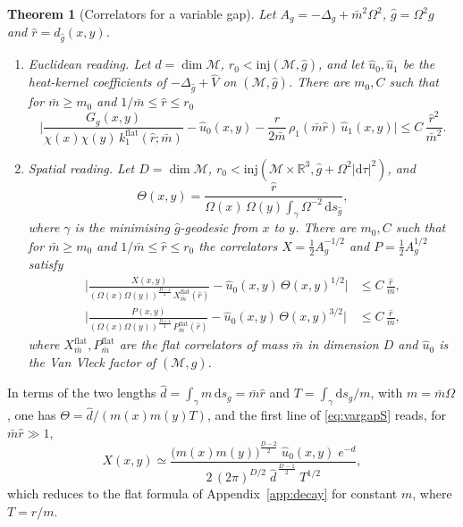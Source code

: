 \documentclass[11pt,a4paper]{article}
\theoremstyle{stmt}
\newtheorem{theorem}{Theorem}[section]
\theoremstyle{defn}
\theoremstyle{rmk}
\numberwithin{equation}{section}
\newcommand{\M}{\mathcal{M}}
\newcommand{\R}{\mathbb{R}}
\newcommand{\dd}{\mathrm{d}}
\begin{document}
\begin{theorem}[Correlators for a variable gap]\label{thm:vargap}
Let $A_g=-\Delta_g+\bar m^2\Omega^2$, $\hat g=\Omega^2g$ and $\hat r=d_{\hat g}(x,y)$.
\begin{enumerate}[label=\textup{(\alph*)}]
\item \emph{Euclidean reading.} Let $d=\dim\M$, $r_0<\mathrm{inj}(\M,\hat g)$, and let $\hat u_0,\hat u_1$ be the heat-kernel coefficients of $-\Delta_{\hat g}+\hat V$ on $(\M,\hat g)$. There are $m_0,C$ such that for $\bar m\ge m_0$ and $1/\bar m\le\hat r\le r_0$
\begin{equation}\label{eq:vargapE}
\Big|\frac{G_g(x,y)}{\chi(x)\chi(y)\,k_1^{\mathrm{flat}}(\hat r;\bar m)}-\hat u_0(x,y)-\frac{\hat r}{2\bar m}\,\rho_1(\bar m\hat r)\,\hat u_1(x,y)\Big|\le C\,\frac{\hat r^2}{\bar m^2}.
\end{equation}
\item \emph{Spatial reading.} Let $D=\dim\M$, $r_0<\mathrm{inj}(\M\times\R^3,\hat g+\Omega^2|\dd\tau|^2)$, and
\begin{equation}\label{eq:Theta}
\Theta(x,y)=\frac{\hat r}{\Omega(x)\,\Omega(y)\int_\gamma\Omega^{-2}\,\dd s_{\hat g}} ,
\end{equation}
where $\gamma$ is the minimising $\hat g$-geodesic from $x$ to $y$. There are $m_0,C$ such that for $\bar m\ge m_0$ and $1/\bar m\le\hat r\le r_0$ the correlators $X=\tfrac12A_g^{-1/2}$ and $P=\tfrac12A_g^{1/2}$ satisfy
\begin{equation}\label{eq:vargapS}
\begin{aligned}
\Big|\frac{X(x,y)}{(\Omega(x)\Omega(y))^{\frac{D-1}{2}}\,X^{\mathrm{flat}}_{\bar m}(\hat r)}-\hat u_0(x,y)\,\Theta(x,y)^{1/2}\Big|&\le C\,\frac{\hat r}{\bar m},\\
\Big|\frac{P(x,y)}{(\Omega(x)\Omega(y))^{\frac{D+1}{2}}\,P^{\mathrm{flat}}_{\bar m}(\hat r)}-\hat u_0(x,y)\,\Theta(x,y)^{3/2}\Big|&\le C\,\frac{\hat r}{\bar m},
\end{aligned}
\end{equation}
where $X^{\mathrm{flat}}_{\bar m},P^{\mathrm{flat}}_{\bar m}$ are the flat correlators of mass $\bar m$ in dimension $D$ and $\hat u_0$ is the Van Vleck factor of $(\M,\hat g)$.
\end{enumerate}
\end{theorem}

In terms of the two lengths $\hat d=\int_\gamma m\,\dd s_g=\bar m\hat r$ and $T=\int_\gamma\dd s_g/m$, with $m=\bar m\Omega$, one has $\Theta=\hat d/(m(x)m(y)T)$, and the first line of \eqref{eq:vargapS} reads, for $\bar m\hat r\gg1$,
\begin{equation}\label{eq:twolengths}
X(x,y)\simeq\frac{\big(m(x)m(y)\big)^{\frac{D-2}{2}}\;\hat u_0(x,y)\;e^{-\hat d}}{2\,(2\pi)^{D/2}\;\hat d^{\,\frac{D-1}{2}}\;T^{1/2}} ,
\end{equation}
which reduces to the flat formula of Appendix~\ref{app:decay} for constant $m$, where $T=r/m$.
\end{document}
